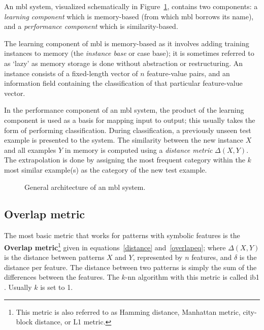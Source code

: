 \documentclass{report}
\begin{document}
An {\sc mbl} system, visualized schematically in
Figure~\ref{mbl-method}, contains two components: a {\em learning
component}\/ which is memory-based (from which {\sc mbl} borrows its
name), and a {\em performance component}\/ which is similarity-based.

The learning component of {\sc mbl} is memory-based as it involves
adding training instances to memory (the {\em instance base} or case
base); it is sometimes referred to as `lazy' as memory storage is done
without abstraction or restructuring.  An instance consists of a
fixed-length vector of $n$ feature-value pairs, and an information
field containing the classification of that particular feature-value
vector.  

In the performance component of an {\sc mbl} system, the product of
the learning component is used as a basis for mapping input to output;
this usually takes the form of performing classification.  During
classification, a previously unseen test example is presented to the
system. The similarity between the new instance $X$ and all examples
$Y$ in memory is computed using a {\em distance metric}
$\Delta(X,Y)$. The extrapolation is done by assigning the most
frequent category within the $k$ most similar example(s) as the
category of the new test example.

\begin{figure}[htb]
        \begin{center}
                \leavevmode
                \epsfxsize=8cm
                \caption{General architecture of an {\sc mbl} system.
                }
                \label{mbl-method}
        \end{center}
\end{figure}

\subsection{Overlap metric}
\label{overlap}

The most basic metric that works for patterns with symbolic features
is the {\bf Overlap metric}\footnote{This metric is also referred to
as Hamming distance, Manhattan metric, city-block distance, or L1
metric.} given in equations~\ref{distance} and~\ref{overlapeq}; where
$\Delta(X,Y)$ is the distance between patterns $X$ and $Y$,
represented by $n$ features, and $\delta$ is the distance per
feature. The distance between two patterns is simply the sum of the
differences between the features. The $k$-{\sc nn} algorithm with this
metric is called {\sc ib1} \cite{Aha+91}. Usually $k$ is set to 1.
\end{document}

